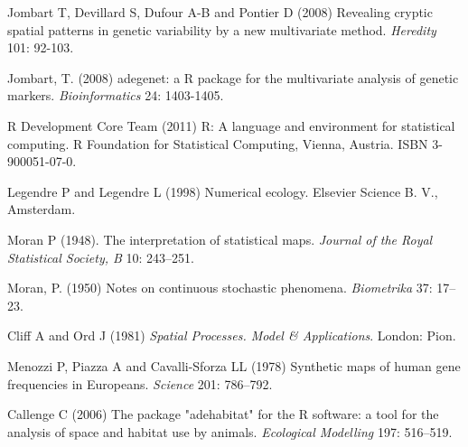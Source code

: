 \documentclass{article}
\begin{document}
\newpage
\begin{thebibliography}{9}

  Jombart T, Devillard S, Dufour A-B and Pontier D (2008) Revealing cryptic spatial
  patterns in genetic variability by a new multivariate method.  \textit{Heredity} 101: 92-103.

  Jombart, T. (2008) adegenet: a R package for the multivariate
  analysis of genetic markers. \textit{Bioinformatics} 24: 1403-1405.

  R Development Core Team (2011) R: A language and environment for
  statistical computing. R Foundation for Statistical Computing,
  Vienna, Austria. ISBN 3-900051-07-0.




  Legendre P and Legendre L (1998) Numerical ecology. Elsevier Science B. V., Amsterdam.

  Moran P (1948). The interpretation of statistical maps.
  \emph{Journal of the Royal Statistical Society, B} 10: 243--251.

  Moran, P. (1950) Notes on continuous stochastic phenomena. \emph{Biometrika} 37: 17--23.

 Cliff A and Ord J (1981) \emph{Spatial Processes. Model \& Applications}. London: Pion.

 Menozzi P, Piazza A and Cavalli-Sforza LL (1978) Synthetic maps of human gene frequencies in {Europeans}.
  \emph{Science} 201: 786--792.


  Callenge C (2006) The package "adehabitat" for the R software: a tool for the analysis
  of space and habitat use by animals. \textit{Ecological Modelling} 197: 516--519.




\end{thebibliography}
\end{document}
